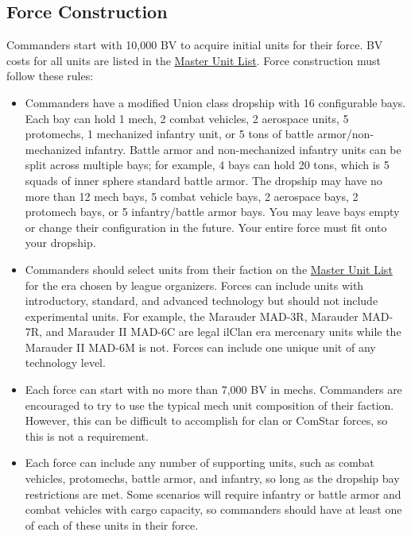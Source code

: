 \documentclass{article}
\begin{document}
\subsection{Force Construction}

Commanders start with 10,000 BV to acquire initial units for their force.
BV costs for all units are listed in the \href{http://www.masterunitlist.info}{Master Unit List}.
Force construction must follow these rules:

\begin{itemize}

\item Commanders have a modified Union class dropship with 16 configurable bays.
Each bay can hold 1 mech, 2 combat vehicles, 2 aerospace units, 5 protomechs, 1 mechanized infantry unit, or 5 tons of battle armor/non-mechanized infantry.
Battle armor and non-mechanized infantry units can be split across multiple bays; for example, 4 bays can hold 20 tons, which is 5 squads of inner sphere standard battle armor.
The dropship may have no more than 12 mech bays, 5 combat vehicle bays, 2 aerospace bays, 2 protomech bays, or 5 infantry/battle armor bays.
You may leave bays empty or change their configuration in the future.
Your entire force must fit onto your dropship.

\item Commanders should select units from their faction on the \href{http://www.masterunitlist.info/}{Master Unit List} for the era chosen by league organizers.
Forces can include units with introductory, standard, and advanced technology but should not include experimental units.
For example, the Marauder MAD-3R, Marauder MAD-7R, and Marauder II MAD-6C are legal ilClan era mercenary units while the Marauder II MAD-6M is not.
Forces can include one unique unit of any technology level.

\item Each force can start with no more than 7,000 BV in mechs.
Commanders are encouraged to try to use the typical mech unit composition of their faction.
However, this can be difficult to accomplish for clan or ComStar forces, so this is not a requirement.

\item Each force can include any number of supporting units, such as combat vehicles, protomechs, battle armor, and infantry, so long as the dropship bay restrictions are met.
Some scenarios will require infantry or battle armor and combat vehicles with cargo capacity, so commanders should have at least one of each of these units in their force.


\end{itemize}
\end{document}
